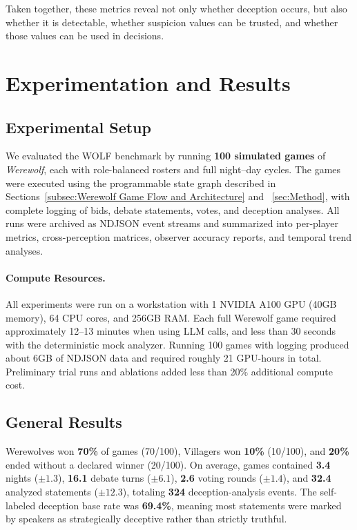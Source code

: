 \documentclass{article}
\begin{document}
Taken together, these metrics reveal not only whether deception occurs, but also whether it is detectable, whether suspicion values can be trusted, and whether those values can be used in decisions. 

\section{Experimentation and Results}
\label{sec:experiments}

\subsection{Experimental Setup}
We evaluated the WOLF benchmark by running \textbf{100 simulated games} of \textit{Werewolf}, each with role-balanced rosters and full night--day cycles. The games were executed using the programmable state graph described in Sections~\ref{subsec:Werewolf Game Flow and Architecture} and ~\ref{sec:Method}, with complete logging of bids, debate statements, votes, and deception analyses. All runs were archived as NDJSON event streams and summarized into per-player metrics, cross-perception matrices, observer accuracy reports, and temporal trend analyses. 
\paragraph{Compute Resources.} 
All experiments were run on a workstation with 1 NVIDIA A100 GPU (40GB memory), 64 CPU cores, and 256GB RAM. Each full Werewolf game required approximately 12–13 minutes when using LLM calls, and less than 30 seconds with the deterministic mock analyzer. Running 100 games with logging produced about 6GB of NDJSON data and required roughly 21 GPU-hours in total. Preliminary trial runs and ablations added less than 20\% additional compute cost.

\subsection{General Results}
Werewolves won \textbf{70\%} of games (70/100), Villagers won \textbf{10\%} (10/100), and \textbf{20\%} ended without a declared winner (20/100). On average, games contained \textbf{3.4} nights ($\pm 1.3$), \textbf{16.1} debate turns ($\pm 6.1$), \textbf{2.6} voting rounds ($\pm 1.4$), and \textbf{32.4} analyzed statements ($\pm 12.3$), totaling \textbf{324} deception-analysis events. The self-labeled deception base rate was \textbf{69.4\%}, meaning most statements were marked by speakers as strategically deceptive rather than strictly truthful. 
\end{document}
